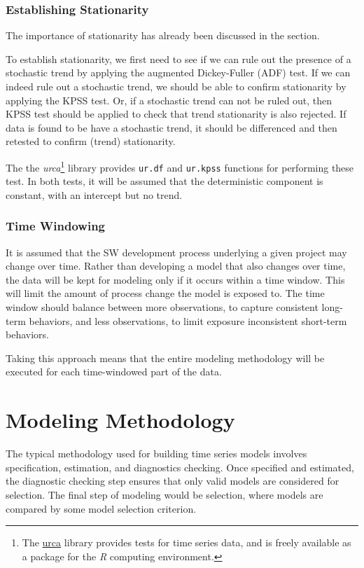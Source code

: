 \documentclass[a4paper]{scrartcl}
\begin{document}
\subsubsection*{Establishing Stationarity}
The importance of stationarity has already been discussed in the  section.

To establish stationarity, we first need to see if we can rule out the presence of a stochastic trend by applying the augmented Dickey-Fuller (ADF) test. If we can indeed rule out a stochastic trend, we should be able to confirm stationarity by applying the KPSS test. Or, if a stochastic trend can not be ruled out, then KPSS test should be applied to check that trend stationarity is also rejected. If data is found to be have a stochastic trend, it should be differenced and then retested to confirm (trend) stationarity.

The the \textit{urca}\footnote{The \href{http://cran.r-project.org/web/packages/urca}{urca} library provides tests for time series data, and is freely available as a package for the \textit{R} computing environment.} library provides \texttt{ur.df} and \texttt{ur.kpss} functions for performing these test. In both tests, it will be assumed that the deterministic component is constant, with an intercept but no trend.

\subsubsection*{Time Windowing}
It is assumed that the SW development process underlying a given project may change over time. Rather than developing a model that also changes over time, the data will be kept for modeling only if it occurs within a time window. This will limit the amount of process change the model is exposed to. The time window should balance between more observations, to capture consistent long-term behaviors, and less observations, to limit exposure inconsistent short-term behaviors.

Taking this approach means that the entire modeling methodology will be executed for each time-windowed part of the data. 

\section*{Modeling Methodology}
\label{sec:modeling_methodology}

The typical methodology used for building time series models involves specification, estimation, and diagnostics checking\cite[p. 478]{box_jenkins_reinsel_2008}. Once specified and estimated, the diagnostic checking step ensures that only valid models are considered for selection. The final step of modeling would be selection, where models are compared by some model selection criterion\cite[pg. 581]{box_jenkins_reinsel_2008}.
\end{document}
